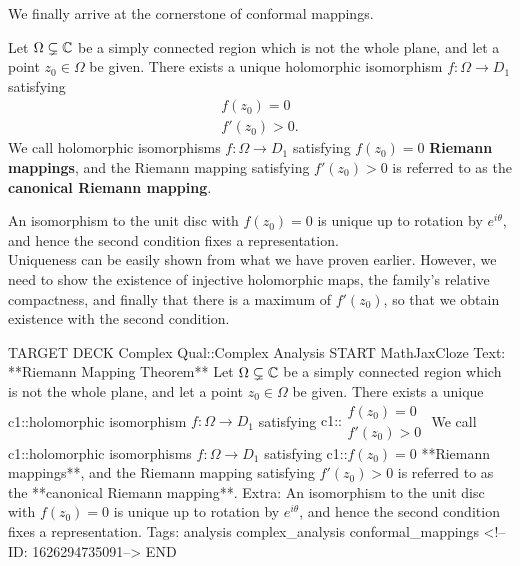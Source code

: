 \documentclass{memoir}
\begin{document}


We finally arrive at the cornerstone of conformal mappings.

\begin{thm}
	Let \(\Omega \subsetneq \mathbb{C}\) be a  simply connected region which is not the whole plane, and let a point \(z_0 \in \Omega \) be given. There exists a unique holomorphic isomorphism \(f:\Omega \to D_1\) satisfying
	\begin{align*}
		f(z_0) = 0\\
		f'(z_0)>0.
	\end{align*}
	We call holomorphic isomorphisms \(f:\Omega \to D_1\) satisfying \(f(z_0) = 0\) \textbf{Riemann mappings}, and the Riemann mapping satisfying \(f'(z_0)>0\) is referred to as the \textbf{canonical Riemann mapping}.
\end{thm}
An isomorphism to the unit disc with \(f(z_0) = 0\) is unique up to rotation by \(e^{i\theta }\), and hence the second condition fixes a representation.\\

Uniqueness can be easily shown from what we have proven earlier. However, we need to show the existence of injective holomorphic maps, the family's relative compactness, and finally that there is a maximum of \(f'(z_0)\), so that we obtain existence with the second condition.

\begin{anki}
TARGET DECK
Complex Qual::Complex Analysis
START
MathJaxCloze
Text: **Riemann Mapping Theorem**
Let \(\Omega \subsetneq \mathbb{C}\) be a  simply connected region which is not the whole plane, and let a point \(z_0 \in \Omega \) be given. There exists a unique {{c1::holomorphic isomorphism}} \(f:\Omega \to D_1\) satisfying
 {{c1::\(\begin{align*}
        	f(z_0) = 0\\
        	f'(z_0)>0
        \end{align*}\)}}
We call {{c1::holomorphic isomorphisms}} \(f:\Omega \to D_1\) satisfying {{c1::\(f(z_0) = 0\)}} **Riemann mappings**, and the Riemann mapping satisfying \(f'(z_0)>0\) is referred to as the **canonical Riemann mapping**.
Extra: An isomorphism to the unit disc with \(f(z_0) = 0\) is unique up to rotation by \(e^{i\theta }\), and hence the second condition fixes a representation.
Tags: analysis complex_analysis conformal_mappings
<!--ID: 1626294735091-->
END
\end{anki}
\end{document}
